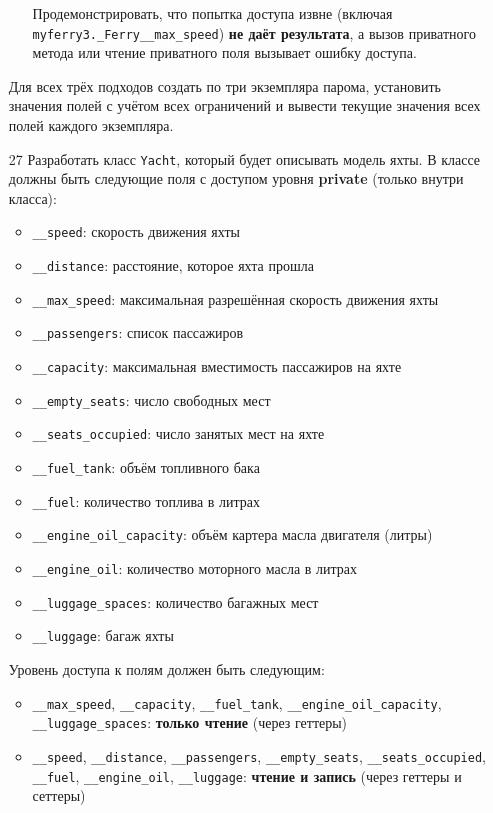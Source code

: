 \begin{enumerate}
\begin{enumerate}
    Продемонстрировать, что попытка доступа извне (включая \texttt{myferry3.\_Ferry\_\_max\_speed}) \textbf{не даёт результата}, а вызов приватного метода или чтение приватного поля вызывает ошибку доступа.
\end{enumerate}
Для всех трёх подходов создать по три экземпляра парома, установить значения полей с учётом всех ограничений и вывести текущие значения всех полей каждого экземпляра.
\item[27] Разработать класс \texttt{Yacht}, который будет описывать модель яхты. В классе должны быть следующие поля с доступом уровня \textbf{private} (только внутри класса):
\begin{itemize}
    \item \texttt{\_\_speed}: скорость движения яхты  
    \item \texttt{\_\_distance}: расстояние, которое яхта прошла  
    \item \texttt{\_\_max\_speed}: максимальная разрешённая скорость движения яхты  
    \item \texttt{\_\_passengers}: список пассажиров  
    \item \texttt{\_\_capacity}: максимальная вместимость пассажиров на яхте  
    \item \texttt{\_\_empty\_seats}: число свободных мест  
    \item \texttt{\_\_seats\_occupied}: число занятых мест на яхте  
    \item \texttt{\_\_fuel\_tank}: объём топливного бака  
    \item \texttt{\_\_fuel}: количество топлива в литрах  
    \item \texttt{\_\_engine\_oil\_capacity}: объём картера масла двигателя (литры)  
    \item \texttt{\_\_engine\_oil}: количество моторного масла в литрах  
    \item \texttt{\_\_luggage\_spaces}: количество багажных мест  
    \item \texttt{\_\_luggage}: багаж яхты  
\end{itemize}
Уровень доступа к полям должен быть следующим:
\begin{itemize}
    \item \texttt{\_\_max\_speed}, \texttt{\_\_capacity}, \texttt{\_\_fuel\_tank}, \texttt{\_\_engine\_oil\_capacity}, \texttt{\_\_luggage\_spaces}: \textbf{только чтение} (через геттеры)  
    \item \texttt{\_\_speed}, \texttt{\_\_distance}, \texttt{\_\_passengers}, \texttt{\_\_empty\_seats}, \texttt{\_\_seats\_occupied}, \texttt{\_\_fuel}, \texttt{\_\_engine\_oil}, \texttt{\_\_luggage}: \textbf{чтение и запись} (через геттеры и сеттеры)

\end{itemize}
\end{enumerate}
